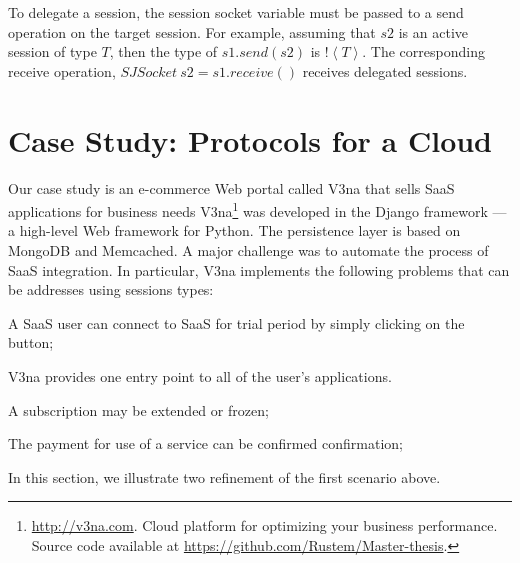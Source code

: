 \documentclass[10pt]{llncs}
\begin{document}

To delegate a session, the session socket variable must be passed to a send operation on the target session.
For example, assuming that $s2$ is an active session of type $T$, then the type of $s1.\textit{send}(s2)$ is $\mathopen!\left<T\right>$.
The corresponding receive operation, $\textit{SJSocket}~s2 = s1.\textit{receive}()$ receives delegated sessions.

\section{Case Study: Protocols for a Cloud}
\label{sect:impl}

Our case study is an e-commerce Web portal called V3na that sells SaaS applications for business needs
V3na\footnote{\url{http://v3na.com}. Cloud platform for optimizing your business performance. Source code available at \url{https://github.com/Rustem/Master-thesis}.}
was developed
in the Django framework --- a high-level Web framework for Python. %
The persistence layer is based on MongoDB and Memcached.
A major challenge was to automate the process of SaaS integration.
In particular, V3na implements the following problems that can be addresses using sessions types:
%
\begin{compactitem}
\item  A SaaS user can connect to SaaS for trial period by simply clicking on the button;

\item  V3na provides one entry point to all of the user's applications.

\item  A subscription may be extended or frozen;

\item  The payment for use of a service can be confirmed confirmation;
\end{compactitem}
In this section, we illustrate two refinement of the first scenario above.
\end{document}
